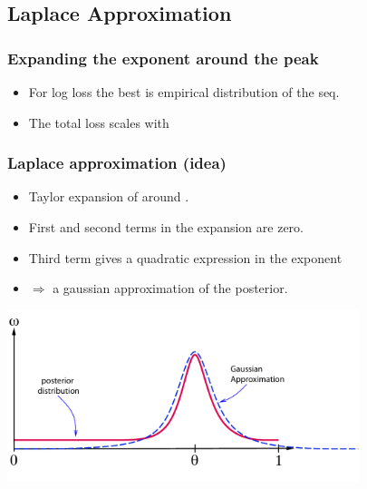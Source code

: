 \documentclass{beamer}
\begin{document}
\subsection{Laplace Approximation}
\begin{frame}
\frametitle{Expanding the exponent around the peak}

\begin{itemize}
\item
For log loss the best \R{$\theta$} is empirical distribution
of the seq.
\R{\[
	\btheta = {\#\{x^t=1;\;\; 1 \leq t \leq T \} \over T} 
\]}
\item
The total loss scales with 
\R{\[
\TEloss{\theta} =
 T \cdot (\btheta \ell(\theta,1) + (1-\btheta)\ell(\theta,0))
 \doteq T \cdot g(\btheta,\theta)
\]}
\end{itemize}
\pause
{}
\end{frame}

\begin{frame}
\frametitle{Laplace approximation (idea)}
\begin{itemize}
\item Taylor expansion of  around \R{$\theta=\btheta$}.
\item
First and second terms in the expansion are zero.
\item
Third term gives a quadratic expression in the exponent
\item
$\Rightarrow$ a gaussian approximation of the posterior.
\end{itemize}
\pause
\includegraphics[height=5cm]{figures/Laplace.pdf}

\end{frame}
\end{document}
